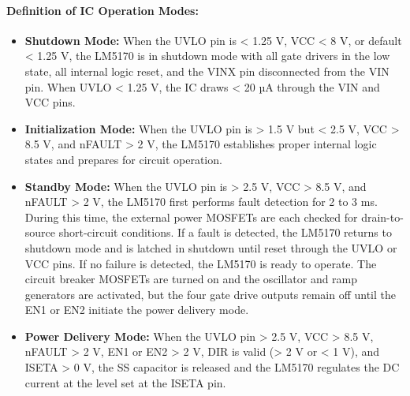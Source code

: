 \paragraph{Definition of IC Operation Modes:}
\begin{itemize}
    \item \textbf{Shutdown Mode:} When the UVLO pin is < 1.25 V, VCC < 8 V, or default < 1.25 V, the LM5170 is in
    shutdown mode with all gate drivers in the low state, all internal logic reset, and the VINX pin disconnected
    from the VIN pin. When UVLO < 1.25 V, the IC draws < 20 µA through the VIN and VCC pins\cite{TI_LM5170_User_Datasheet}.
    \item \textbf{Initialization Mode:}  When the UVLO pin is > 1.5 V but < 2.5 V, VCC > 8.5 V, and nFAULT > 2 V, the LM5170
    establishes proper internal logic states and prepares for circuit operation\cite{TI_LM5170_User_Datasheet}.
    \item \textbf{Standby Mode:}  When the UVLO pin is > 2.5 V, VCC > 8.5 V, and nFAULT > 2 V, the LM5170 first
    performs fault detection for 2 to 3 ms. During this time, the external power MOSFETs are each checked for
    drain-to-source short-circuit conditions. If a fault is detected, the LM5170 returns to shutdown mode and is
    latched in shutdown until reset through the UVLO or VCC pins. If no failure is detected, the LM5170 is ready
    to operate. The circuit breaker MOSFETs are turned on and the oscillator and ramp generators are activated,
    but the four gate drive outputs remain off until the EN1 or EN2 initiate the power delivery mode\cite{TI_LM5170_User_Datasheet}.
    \item \textbf{Power Delivery Mode:}  When the UVLO pin > 2.5 V, VCC > 8.5 V, nFAULT > 2 V, EN1 or EN2 > 2 V, DIR
    is valid (> 2 V or < 1 V), and ISETA > 0 V, the SS capacitor is released and the LM5170 regulates the DC
    current at the level set at the ISETA pin\cite{TI_LM5170_User_Datasheet}.
\end{itemize}

